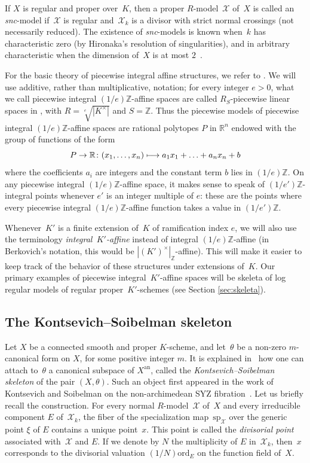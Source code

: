 \documentclass[JEP,XML,SOM,Unicode,NoFloatCountersInSection]{cedram}
\newcommand{\mto}{\mathchoice{\longmapsto}{\mapsto}{\mapsto}{\mapsto}}
\theoremstyle{definition}
\numberwithin{equation}{subsection}
\newcommand{\Z}{\ensuremath{\mathbb{Z}}}
\newcommand{\R}{\ensuremath{\mathbb{R}}}
\newcommand{\cX}{\ensuremath{\mathscr{X}}}
\newcommand{\snc}{\textit{snc}}
\newcommand{\an}{\mathrm{an}}
\newcommand{\ord}{\mathrm{ord}}
\newcommand{\spe}{\mathrm{sp}}
\let\form\theta
\begin{document}
If $X$ is regular and proper over~$K$, then a proper $R$\nobreakdash-model~$\cX$ of~$X$ is called an \snc-model if~$\cX$ is regular and~$\cX_k$ is a divisor with strict normal crossings (not necessarily reduced). The existence of \snc-models is known when~$k$ has characteristic zero (by Hironaka's resolution of singularities), and in arbitrary characteristic when the dimension of~$X$ is at most $2$~\cite{CJS, cossart-piltant}.

For the basic theory of piecewise integral affine structures, we refer to
\cite[\S1]{BerkContractII}. We will use additive, rather than multiplicative, notation;
for every integer $e>0$,
what we call piecewise integral $(1/e)\Z$-affine spaces are called $R_S$-piecewise linear spaces in \cite[\S1]{BerkContractII}, with $R=\sqrt[e]{|K^{\times}|}$ and
$S=\Z$. Thus the piecewise models of
piecewise integral $(1/e)\Z$-affine spaces are rational polytopes $P$ in $\R^n$ endowed with the group of functions of the form
\[
P\to \R\colon (x_1,\ldots,x_n)\mto a_1x_1+\ldots+a_nx_n+b
\]
where the coefficients $a_i$ are integers and the constant term $b$ lies in $(1/e)\Z$.
On any piecewise integral $(1/e)\Z$-affine space, it makes sense to speak of $(1/e')\Z$-integral points whenever $e'$ is an integer multiple of $e$: these are the points where every piecewise integral $(1/e)\Z$-affine function takes a value in $(1/e')\Z$.

Whenever~$K'$ is a finite extension of~$K$ of ramification index $e$, we will also use the terminology {\em integral~$K'$-affine}
instead of integral $(1/e)\Z$-affine (in Berkovich's notation, this would be $|(K')^{\times}|_{\Z}$-affine).
This will make it easier to keep track of the behavior of these structures under extensions of~$K$. Our primary examples of
piecewise integral~$K'$-affine spaces will be skeleta of log regular models of regular proper~$K'$-schemes (see Section \ref{sec:skeleta}).

\subsection{The Kontsevich--Soibelman skeleton}\label{ss:KS}
Let $X$ be a connected smooth and proper $K$\nobreakdash-scheme, and let~$\form$ be a non-zero $m$-canonical form on $X$, for some positive integer $m$.
It is explained in~\cite{MuNi} how one can attach to~$\form$ a canonical subspace of $X^{\an}$, called the {\em Kontsevich--Soibelman skeleton} of the pair $(X,\form)$.
Such an object first appeared in the work of Kontsevich and Soibelman on the non-archimedean SYZ fibration~\cite{KS}. Let us briefly recall the construction. For every normal $R$\nobreakdash-model~$\cX$ of~$X$ and every irreducible component $E$ of~$\cX_k$, the fiber of the specialization map~$\spe_{\cX}$ over the generic point $\xi$ of $E$ contains a unique point~$x$. This point is called the {\em divisorial point} associated with~$\cX$ and $E$. If we denote by $N$ the multiplicity of $E$ in~$\cX_k$, then~$x$ corresponds to the divisorial valuation $(1/N)\ord_E$ on the function field of~$X$.
\end{document}
